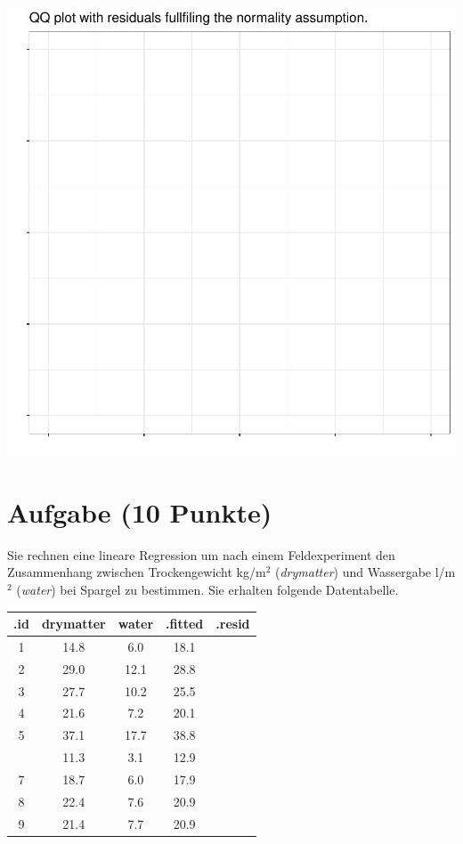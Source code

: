 \documentclass[a4paper, 10pt]{scrartcl}\usepackage[]{graphicx}\usepackage[]{xcolor}
\makeatletter
\def\maxwidth{ %
  \ifdim\Gin@nat@width>\linewidth
    \linewidth
  \else
    \Gin@nat@width
  \fi
}
\newenvironment{knitrout}{}{} %
\makeatother
\begin{document}
{\centering \includegraphics[width=\maxwidth]{img/regression-04-1} 

}



 
\clearpage

\section{Aufgabe \hfill (10 Punkte)}

Sie rechnen eine lineare Regression um nach einem Feldexperiment den
Zusammenhang zwischen Trockengewicht kg/m$^2$ (\textit{drymatter}) und
Wassergabe l/m$^2$ (\textit{water}) bei Spargel zu bestimmen. Sie erhalten
folgende Datentabelle.

\begin{knitrout}
\color{fgcolor}\begin{table}[!h]
\centering\begingroup\fontsize{12}{14}\selectfont

\begin{tabular}{ccccc}
\toprule
.id & drymatter & water & .fitted & .resid\\
\midrule
1 & 14.8 & 6.0 & 18.1 & \\
2 & 29.0 & 12.1 & 28.8 & \\
3 & 27.7 & 10.2 & 25.5 & \\
4 & 21.6 & 7.2 & 20.1 & \\
5 & 37.1 & 17.7 & 38.8 & \\
\addlinespace
6 & 11.3 & 3.1 & 12.9 & \\
7 & 18.7 & 6.0 & 17.9 & \\
8 & 22.4 & 7.6 & 20.9 & \\
9 & 21.4 & 7.7 & 20.9 & \\
\bottomrule
\end{tabular}
\endgroup{}
\end{table}

\end{knitrout}
\end{document}
